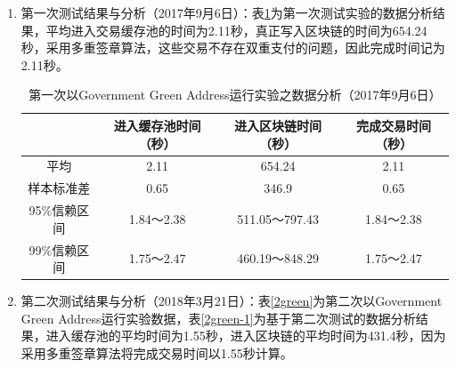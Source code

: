 		\begin{enumerate}
			\item 第一次测试结果与分析（2017年9月6日）：表\ref{1green}为第一次测试实验的数据分析结果，平均进入交易缓存池的时间为2.11秒，真正写入区块链的时间为654.24秒，采用多重签章算法，这些交易不存在双重支付的问题，因此完成时间记为2.11秒。

			\begin{table}[!htbp]
				\centering
				\caption{第一次以Government Green Address运行实验之数据分析（2017年9月6日）}
				\label{1green}
				\begin{tabular}{|c|c|c|c|}
				\hline
				         & 进入缓存池时间（秒） & 进入区块链时间（秒）    & 完成交易时间（秒） \\ \hline
				平均       & 2.11       & 654.24        & 2.11      \\ \hline
				样本标准差    & 0.65       & 346.9         & 0.65      \\ \hline
				95\%信赖区间 & 1.84～2.38  & 511.05～797.43 & 1.84～2.38 \\ \hline
				99\%信赖区间 & 1.75～2.47  & 460.19～848.29 & 1.75～2.47 \\ \hline
				\end{tabular}
				\end{table}

			\item 第二次测试结果与分析（2018年3月21日）：表\ref{2green}为第二次以Government Green Address运行实验数据，表\ref{2green-1}为基于第二次测试的数据分析结果，进入缓存池的平均时间为1.55秒，进入区块链的平均时间为431.4秒，因为采用多重签章算法将完成交易时间以1.55秒计算。

		\end{enumerate}
